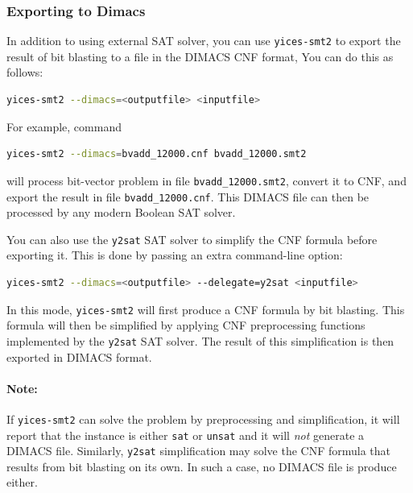 \documentclass[11pt,twoside,fleqn,openright,titlepage]{cslreport}
\begin{document}
\subsubsection*{Exporting to Dimacs}

In addition to using external SAT solver, you can use
\texttt{yices-smt2} to export the result of bit blasting to a file in
the DIMACS CNF format, You can do this as follows:
\begin{small}
\begin{lstlisting}[language=sh]
   yices-smt2 --dimacs=<outputfile> <inputfile>
\end{lstlisting}
\end{small}
For example, command
\begin{small}
\begin{lstlisting}[language=sh]
   yices-smt2 --dimacs=bvadd_12000.cnf bvadd_12000.smt2
\end{lstlisting}
\end{small}
will process bit-vector problem in file \texttt{bvadd\_12000.smt2},
convert it to CNF, and export the result in file \texttt{bvadd\_12000.cnf}.
This DIMACS file can then be processed by any modern Boolean SAT solver.

\medskip\noindent
You can also use the \texttt{y2sat} SAT solver to simplify the CNF formula before exporting it.
This is done by passing an extra command-line option:
\begin{small}
\begin{lstlisting}[language=sh]
   yices-smt2 --dimacs=<outputfile> --delegate=y2sat <inputfile>
\end{lstlisting}
\end{small}
In this mode, \texttt{yices-smt2} will first produce a CNF formula by
bit blasting. This formula will then be simplified by applying CNF
preprocessing functions implemented by the \texttt{y2sat} SAT
solver. The result of this simplification is then exported in DIMACS format.

\paragraph{Note:} If \texttt{yices-smt2} can solve the problem by preprocessing and simplification,
it will report that the instance is either \texttt{sat} or
\texttt{unsat} and it will \emph{not} generate a DIMACS
file. Similarly, \texttt{y2sat} simplification may solve the CNF
formula that results from bit blasting on its own. In such a case, no DIMACS file is produce either.
\end{document}
